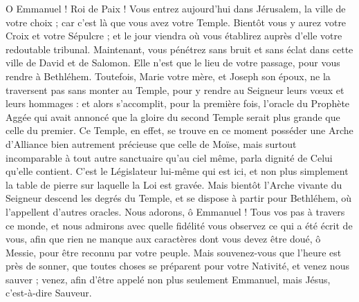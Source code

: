 \documentclass[%
fontsize=10%
,a6paper%
,DIV=15%
]{scrartcl}
\begin{document}
O Emmanuel ! Roi de Paix ! Vous entrez aujourd’hui dans Jérusalem, la ville de votre choix ; car c’est là que vous avez votre Temple. Bientôt vous y aurez votre Croix et votre Sépulcre ; et le jour viendra où vous établirez auprès d’elle votre redoutable tribunal. Maintenant, vous pénétrez sans bruit et sans éclat dans cette ville de David et de Salomon. Elle n’est que le lieu de votre passage, pour vous rendre à Bethléhem. Toutefois, Marie votre mère, et Joseph son époux, ne la traversent pas sans monter au Temple, pour y rendre au Seigneur leurs vœux et leurs hommages : et alors s’accomplit, pour la première fois, l’oracle du Prophète Aggée qui avait annoncé que la gloire du second Temple serait plus grande que celle du premier. Ce Temple, en effet, se trouve en ce moment posséder une Arche d’Alliance bien autrement précieuse que celle de Moïse, mais surtout incomparable à tout autre sanctuaire qu’au ciel même, parla dignité de Celui qu’elle contient. C’est le Législateur lui-même qui est ici, et non plus simplement la table de pierre sur laquelle la Loi est gravée. Mais bientôt l’Arche vivante du Seigneur descend les degrés du Temple, et se dispose à partir pour Bethléhem, où l’appellent d’autres oracles. Nous adorons, ô Emmanuel ! Tous vos pas à travers ce monde, et nous admirons avec quelle fidélité vous observez ce qui a été écrit de vous, afin que rien ne manque aux caractères dont vous devez être doué, ô Messie, pour être reconnu par votre peuple. Mais souvenez-vous que l’heure est près de sonner, que toutes choses se préparent pour votre Nativité, et venez nous sauver ; venez, afin d’être appelé non plus seulement Emmanuel, mais Jésus, c’est-à-dire Sauveur.


\newpage
{}
\label{section:magnificat}
\gloria[tonus=per]
\medskip
{}
\medskip
{}
\end{document}
